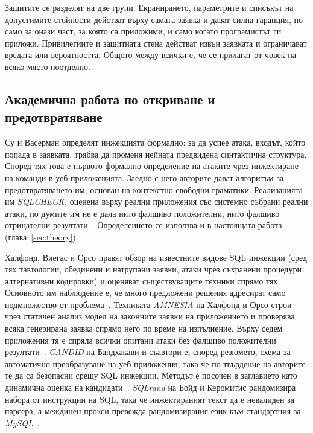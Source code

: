 Защитите се разделят на две групи. Екранирането, параметрите и списъкът на допустимите
стойности действат върху самата заявка и дават силна гаранция, но само за онази част,
за която са приложими, и само когато програмистът ги приложи. Привилегиите и
защитната стена действат извън заявката и ограничават вредата или вероятността.
Общото между всички е, че се прилагат от човек на всяко място поотделно.

\subsection{Академична работа по откриване и предотвратяване}
\label{sec:existing-academic}

Су и Васерман определят инжекцията формално: за да успее атака, входът, който попада
в заявката, трябва да променя нейната предвидена синтактична структура. Според тях
това е първото формално определение на атаките чрез инжектиране на команди в уеб
приложенията. Заедно с него авторите дават алгоритъм за предотвратяването им, основан
на контекстно-свободни граматики. Реализацията им \textit{SQLCHECK}, оценена върху
реални приложения със системно събрани реални атаки, по думите им не е дала нито
фалшиво положителни, нито фалшиво отрицателни резултати~\cite{su2006essence}. Определението
се използва и в настоящата работа (глава~\ref{sec:theory}).

Халфонд, Виегас и Орсо правят обзор на известните видове SQL инжекции (сред тях
тавтологии, обединени и натрупани заявки, атаки чрез съхранени процедури,
алтернативни кодировки) и оценяват съществуващите техники спрямо тях. Основното им
наблюдение е, че много предложени решения адресират само подмножество от
проблема~\cite{halfond2006classification}. Техниката \textit{AMNESIA} на Халфонд и
Орсо строи чрез статичен анализ модел на законните заявки на приложението и проверява
всяка генерирана заявка спрямо него по време на изпълнение. Върху седем приложения
тя е спряла всички опитани атаки без фалшиво положителни резултати~\cite{halfond2005amnesia}.
\textit{CANDID} на Бандхакави и съавтори е, според резюмето, схема за
автоматично преобразуване на уеб приложения, така че по твърдение на авторите те да
са безопасни срещу SQL инжекции. Методът е посочен в заглавието като динамична
оценка на кандидати~\cite{bandhakavi2007candid}. \textit{SQLrand} на Бойд и
Керомитис рандомизира набора от инструкции на SQL, така че инжектираният текст да е
невалиден за парсера, а междинен прокси превежда рандомизирания език към стандартния
за \textit{MySQL}~\cite{boyd2004sqlrand}.

